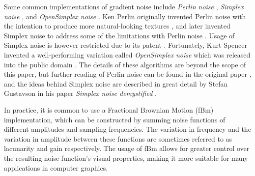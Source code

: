 Some common implementations of gradient noise include \textit{Perlin noise} \cite{perlin_noise} \cite{perlin_noise2}, \textit{Simplex noise} \cite{simplex_noise}, and \textit{OpenSimplex noise} \cite{opensimplex_noise_blog} \cite{opensimplex_noise_code}.
Ken Perlin originally invented Perlin noise with the intention to produce more natural-looking textures \cite{perlin_noise}, and later invented Simplex noise to address some of the limitations with Perlin noise \cite{simplex_noise}.
Usage of Simplex noise is however restricted due to its patent \cite{opensimplex_noise_patent}.
Fortunately, Kurt Spencer invented a well-performing variation called \textit{OpenSimplex noise} which was released into the public domain \cite{opensimplex_noise_blog} \cite{opensimplex_noise_code}.
The details of these algorithms are beyond the scope of this paper, but further reading of Perlin noise can be found in the original paper \cite{perlin_noise}, and the ideas behind Simplex noise are described in great detail by Stefan Gustavson in his paper \textit{Simplex noise demystified} \cite{simplex_noise_explained}.

In practice, it is common to use a Fractional Brownian Motion (fBm) implementation, which can be constructed by summing noise functions of different amplitudes and sampling frequencies.
The variation in frequency and the variation in amplitude between these functions are sometimes referred to as lacunarity and gain respectively.
The usage of fBm allows for greater control over the resulting noise function's visual properties, making it more suitable for many applications in computer graphics.

